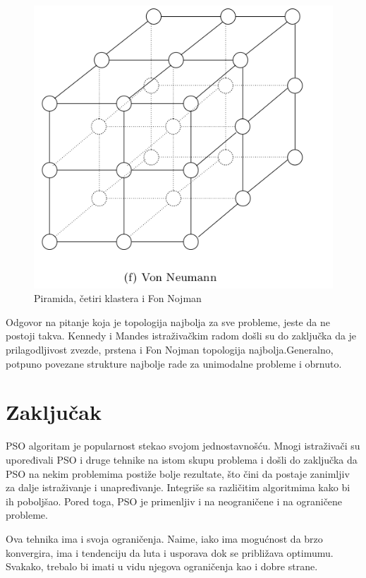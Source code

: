 \documentclass[a4paper]{article}
\begin{document}
\begin{figure}[htp]
    \includegraphics[scale=0.2]{VonNeumann.png}
    \caption{Piramida, četiri klastera i Fon Nojman}
    \label{fig:PiramidaCetiriKlasteraFonNojman}
\end{figure}
Odgovor na pitanje koja je topologija najbolja za sve probleme, jeste da ne postoji takva.
Kennedy i Mandes istraživačkim radom došli su do zaključka da je prilagodljivost zvezde, prstena i Fon Nojman topologija najbolja.Generalno, potpuno povezane strukture najbolje rade za unimodalne probleme i obrnuto.

\section{Zaključak}

PSO algoritam je popularnost stekao svojom jednostavnošću. Mnogi istraživači su upoređivali PSO i druge tehnike na istom skupu problema i došli do zaključka da PSO  na nekim problemima postiže bolje rezultate, što čini da postaje zanimljiv za dalje istraživanje i unapređivanje. Integriše sa različitim algoritmima kako bi ih poboljšao. Pored toga, PSO je primenljiv i na neograničene i na ograničene probleme.

Ova tehnika ima i svoja ograničenja. Naime, iako ima mogućnost da brzo konvergira, ima i tendenciju da luta i usporava dok se približava optimumu. Svakako, trebalo bi imati u vidu njegova ograničenja kao i dobre strane.


\appendix
 

\end{document}
